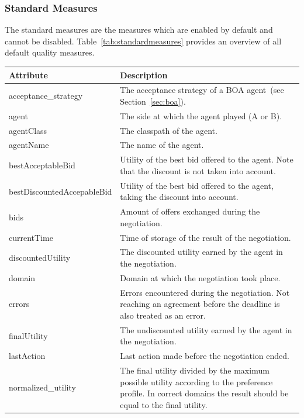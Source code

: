 \documentclass[]{article}
\begin{document}
\subsubsection{Standard Measures}
The standard measures are the measures which are enabled by default and cannot be disabled. Table~\ref{tab:standardmeasures} provides an overview of all default quality measures.

\begin{table}[h!]
	\small
	\center
	\begin{tabular}{|p{4.7cm}|p{9.2cm}|}
		\hline\hline
		\textbf{Attribute} & \textbf{Description}\\[-0.2ex] 
		\hline\hline
		acceptance\_strategy & The acceptance strategy of a BOA agent~(see Section~\ref{sec:boa}). \\[-0.2ex]\hline
		agent & The side at which the agent played (A or B). \\[-0.2ex]\hline
		agentClass & The classpath of the agent. \\[-0.2ex]\hline
		agentName & The name of the agent. \\[-0.2ex]\hline
		bestAcceptableBid & Utility of the best bid offered to the agent. Note that the discount is not taken into account. \\[-0.2ex]\hline
		bestDiscountedAccepableBid & Utility of the best bid offered to the agent, taking the discount into account. \\[-0.2ex]\hline
		bids & Amount of offers exchanged during the negotiation. \\[-0.2ex]\hline
		currentTime & Time of storage of the result of the negotiation. \\[-0.2ex]\hline
		discountedUtility & The discounted utility earned by the agent in the negotiation. \\[-0.3ex]\hline
		domain & Domain at which the negotiation took place.\\[-0.3ex]\hline
		errors & Errors encountered during the negotiation. Not reaching an agreement before the deadline is also treated as an error.\\[-0.3ex]\hline
		finalUtility & The undiscounted utility earned by the agent in the negotiation.\\[-0.3ex]\hline
		lastAction & Last action made before the negotiation ended.\\[-0.3ex]\hline
		normalized\_utility & The final utility divided by the maximum possible utility according to the preference profile. In correct domains the result should be equal to the final utility.\\[-0.3ex]\hline

\end{tabular}
\end{table}
\end{document}
